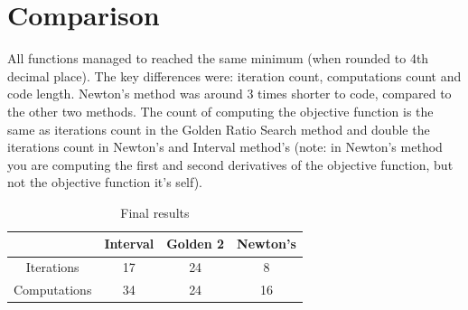 \documentclass{article}
\begin{document}
    \section{Comparison}
        All functions managed to reached the same minimum (when rounded to 4th decimal place). The key differences were: iteration count, computations count and code length. Newton's method was around 3 times shorter to code, compared to the other two methods. The count of computing the objective function is the same as iterations count in the Golden Ratio Search method and double the iterations count in Newton's and Interval method's (note: in Newton's method you are computing the first and second derivatives of the objective function, but not the objective function it's self).
        \begin{table}[h!]
            \centering
            \begin{tabular}{|c|c|c|c|}
            \hline
            & Interval & Golden 2 & Newton's \\
            \hline
            Iterations & 17 & 24 & 8 \\
            \hline
            Computations& 34 & 24 & 16 \\
            \hline
            \end{tabular}
            \caption{Final results}
        \end{table}
\end{document}
